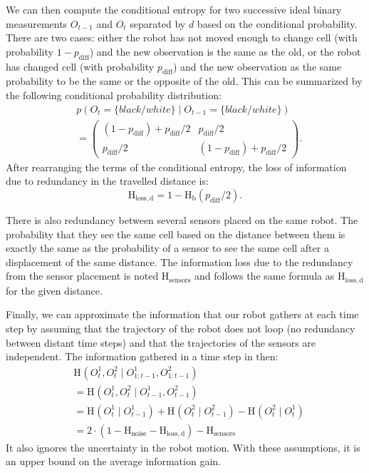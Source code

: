 \documentclass[letterpaper, 10pt, conference]{ieeeconf}
\newcommand{\ent}[1]{\mathrm{H}_\mathrm{#1}} %
\begin{document}
We can then compute the conditional entropy for two successive ideal binary measurements $O_{t-1}$ and $O_t$ separated by $d$ based on the conditional probability.
There are two cases: either the robot has not moved enough to change cell (with probability $1 - p_\mathrm{diff}$) and the new observation is the same as the old, or the robot has changed cell (with probability $p_\mathrm{diff}$) and the new observation as the same probability to be the same or the opposite of the old.
This can be summarized by the following conditional probability distribution:
\begin{align*}
	&p(O_t=\{black/white\} \mid O_{t-1}=\{black/white\})\\
	&= \begin{pmatrix}
		(1 - p_\mathrm{diff}) + p_\mathrm{diff}/2 & p_\mathrm{diff}/2\\
		p_\mathrm{diff}/2 & (1 - p_\mathrm{diff}) + p_\mathrm{diff}/2
	\end{pmatrix}.
\end{align*}
After rearranging the terms of the conditional entropy, the loss of information due to redundancy in the travelled distance is:
\begin{displaymath}
	\ent{loss,d} = 1 - \ent{b}(p_\mathrm{diff}/2).
\end{displaymath}

There is also redundancy between several sensors placed on the same robot.
The probability that they see the same cell based on the distance between them is exactly the same as the probability of a sensor to see the same cell after a displacement of the same distance.
The information loss due to the redundancy from the sensor placement is noted $\ent{sensors}$ and follows the same formula as $\ent{loss,d}$ for the given distance.

Finally, we can approximate the information that our robot gathers at each time step by assuming that the trajectory of the robot does not loop (no redundancy between distant time steps) and that the trajectories of the sensors are independent. 
The information gathered in a time step in then:
\begin{align*}
	&\ent{}(O^1_t, O^2_t \mid O^1_{1:t-1}, O^2_{1:t-1})\\
	&= \ent{}(O^1_t, O^2_t \mid O^1_{t-1}, O^2_{t-1}) \\
	&= \ent{}(O^1_t \mid O^1_{t-1}) + \ent{}(O^2_t \mid O^2_{t-1}) - \ent{}(O^2_t \mid O^1_t) \\
	&= 2\cdot(1-\ent{noise}-\ent{loss,d}) - \ent{sensors}%
\end{align*}
It also ignores the uncertainty in the robot motion.
With these assumptions, it is an upper bound on the average information gain.
\end{document}
